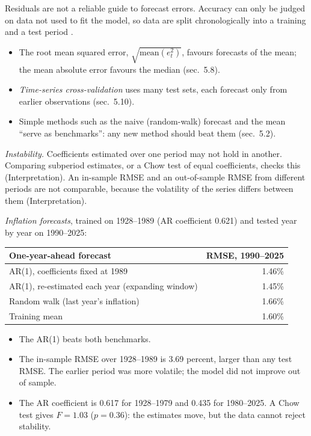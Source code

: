 \begin{qfmethod}\label{meth:forecast-accuracy-evaluation}
 Residuals are not a reliable guide to forecast errors. Accuracy can only be judged on data not used to fit the model, so data are split chronologically into a training and a test period \citep[sec.~5.8]{s7-hyndman}.
\begin{itemize}
\item The root mean squared error, $\sqrt{\mathrm{mean}(e_t^2)}$, favours forecasts of the mean; the mean absolute error favours the median (sec.~5.8).
\item \emph{Time-series cross-validation} uses many test sets, each forecast only from earlier observations (sec.~5.10).
\item Simple methods such as the naive (random-walk) forecast and the mean ``serve as benchmarks'': any new method should beat them (sec.~5.2).
\end{itemize}
\emph{Instability.} Coefficients estimated over one period may not hold in another. Comparing subperiod estimates, or a Chow test of equal coefficients, checks this (Interpretation). An in-sample RMSE and an out-of-sample RMSE from different periods are not comparable, because the volatility of the series differs between them (Interpretation).

 \emph{Inflation forecasts}, trained on 1928--1989 (AR coefficient 0.621) and tested year by year on 1990--2025:
\begin{center}\small
\begin{tabular}{@{}lr@{}}
\toprule
One-year-ahead forecast & RMSE, 1990--2025 \\
\midrule
AR(1), coefficients fixed at 1989 & 1.46\% \\
AR(1), re-estimated each year (expanding window) & 1.45\% \\
Random walk (last year's inflation) & 1.66\% \\
Training mean & 1.60\% \\
\bottomrule
\end{tabular}
\end{center}
\begin{itemize}
\item The AR(1) beats both benchmarks.
\item The in-sample RMSE over 1928--1989 is 3.69 percent, larger than any test RMSE. The earlier period was more volatile; the model did not improve out of sample.
\item The AR coefficient is 0.617 for 1928--1979 and 0.435 for 1980--2025. A Chow test gives $F=1.03$ ($p=0.36$): the estimates move, but the data cannot reject stability.
\end{itemize}


\end{qfmethod}
